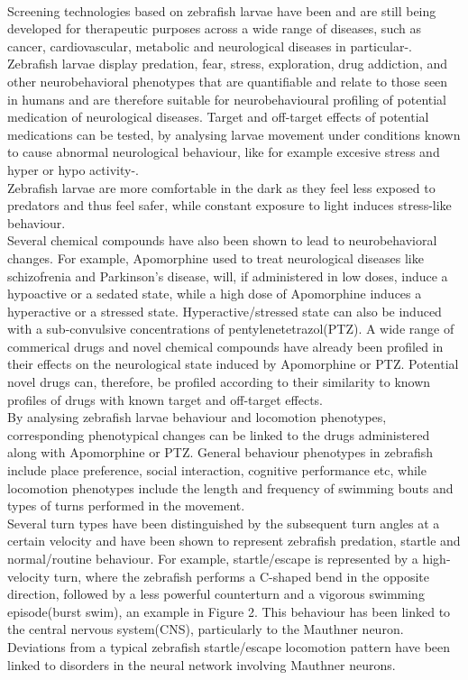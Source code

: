 \documentclass[a4paper,12pt]{article}
\begin{document}
\\
Screening technologies based on zebrafish larvae have been and are still being developed for therapeutic purposes across a wide range of diseases, such as cancer, cardiovascular, metabolic and neurological diseases in particular\cite{ref5}-\cite{ref8}. \\Zebrafish larvae display predation, fear, stress, exploration, drug addiction, and other neurobehavioral phenotypes that are quantifiable and relate to those seen in humans and are therefore suitable for neurobehavioural profiling of potential medication of neurological diseases\cite{ref9}\cite{ref10}. Target and off-target effects of potential medications can be tested, by analysing larvae movement under conditions known to cause abnormal neurological behaviour, like for example excesive stress and hyper or hypo activity\cite{ref11}-\cite{ref16}.
\\Zebrafish larvae are more comfortable in the dark as they feel less exposed to predators and thus feel safer, while constant exposure to light induces stress-like behaviour\cite{ref16}. \\Several chemical compounds have also been shown to lead to neurobehavioral changes. 
For example, Apomorphine used to treat neurological diseases like schizofrenia\cite{ref12} and Parkinson's disease\cite{ref11}, will, if administered in low doses, induce a hypoactive or a sedated state, while a high dose of Apomorphine induces a hyperactive or a stressed state\cite{ref13}. Hyperactive/stressed state can also be induced with a sub-convulsive concentrations of pentylenetetrazol(PTZ)\cite{ref14}. A wide range of commerical drugs and novel chemical compounds have already been profiled in their effects on the neurological state induced by Apomorphine or PTZ\cite{ref13}\cite{ref15}. Potential novel drugs can, therefore, be profiled according to their similarity to known profiles of drugs with known target and off-target effects.\\By analysing zebrafish larvae behaviour and locomotion phenotypes, corresponding phenotypical changes can be linked to the drugs administered along with Apomorphine or PTZ. General behaviour phenotypes in zebrafish include place preference, social interaction, cognitive performance etc, while locomotion phenotypes include the length and frequency of swimming bouts and types of turns performed in the movement\cite{ref17}\cite{ref18}. \\Several turn types have been distinguished by the subsequent turn angles at a certain velocity and have been shown to represent zebrafish predation, startle and normal/routine behaviour\cite{ref9}. For example, startle/escape is represented by a high-velocity turn, where the zebrafish performs a C-shaped bend in the opposite direction, followed by a less powerful counterturn and a vigorous swimming episode(burst swim), an example in Figure 2. This behaviour has been linked to the central nervous system(CNS), particularly to the Mauthner neuron\cite{ref19}. Deviations from a typical zebrafish startle/escape locomotion pattern have been linked to disorders in the neural network involving Mauthner neurons\cite{ref20}.
\end{document}
